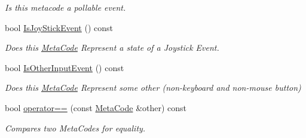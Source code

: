\begin{DoxyCompactItemize}
\begin{DoxyCompactList}\small\item\em Is this metacode a pollable event. \item\end{DoxyCompactList}\item 
bool \hyperlink{classphys_1_1MetaCode_a00ad1171e9e081318e6efc25a371ee05}{IsJoyStickEvent} () const 
\begin{DoxyCompactList}\small\item\em Does this \hyperlink{classphys_1_1MetaCode}{MetaCode} Represent a state of a Joystick Event. \item\end{DoxyCompactList}\item 
bool \hyperlink{classphys_1_1MetaCode_a6eb682ae2a56238c6afd3933cb40843b}{IsOtherInputEvent} () const 
\begin{DoxyCompactList}\small\item\em Does this \hyperlink{classphys_1_1MetaCode}{MetaCode} Represent some other (non-\/keyboard and non-\/mouse button) \item\end{DoxyCompactList}\item 
bool \hyperlink{classphys_1_1MetaCode_a506486e5a6f08d50a5af42fa6d48a7f5}{operator==} (const \hyperlink{classphys_1_1MetaCode}{MetaCode} \&other) const 
\begin{DoxyCompactList}\small\item\em Compares two MetaCodes for equality. \item\end{DoxyCompactList}\end{DoxyCompactItemize}
